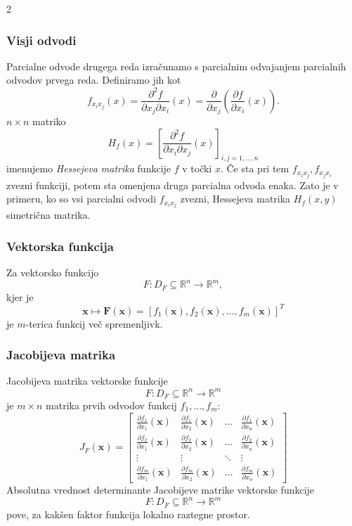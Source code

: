 \documentclass{article}
\begin{document}
\begin{multicols}{2}
	\subsubsection{Visji odvodi}
	Parcialne odvode drugega reda izračunamo s parcialnim odvajanjem parcialnih odvodov prvega reda. Definiramo jih kot
	\[
		f_{x_i x_j}(x) = \frac{\partial^2 f}{\partial x_j \partial x_i}(x) = \frac{\partial}{\partial x_j} \left( \frac{\partial f}{\partial x_i}(x) \right).
	\]
	\( n \times n \) matriko
	\[
		H_f(x) = \left[ \frac{\partial^2 f}{\partial x_i \partial x_j}(x) \right]_{i,j=1,...,n}
	\]
	imenujemo \textit{Hessejeva matrika} funkcije \( f \) v točki \( x \). Če sta pri tem \( f_{x_i x_j}, f_{x_j x_i} \) zvezni funkciji, potem sta omenjena druga parcialna odvoda enaka. Zato je v primeru, ko so vsi parcialni odvodi \( f_{x_i x_j} \) zvezni, Hessejeva matrika \( H_f(x, y) \) simetrična matrika.


	\subsubsection{Vektorska funkcija}
	Za vektorsko funkcijo
	\[ F: D_F \subseteq \mathbb{R}^n \rightarrow \mathbb{R}^m, \]
	kjer je
	\[ \mathbf{x} \mapsto \mathbf{F}(\mathbf{x}) = [f_1(\mathbf{x}), f_2(\mathbf{x}), \ldots, f_m(\mathbf{x})]^T \]
	je \( m \)-terica funkcij več spremenljivk.

	\subsubsection{Jacobijeva matrika}
	Jacobijeva matrika vektorske funkcije
	\[ F: D_F \subseteq \mathbb{R}^n \rightarrow \mathbb{R}^m \]
	je \( m \times n \) matrika prvih odvodov funkcij \( f_1, \ldots, f_m \):
	\[
		J_F(\mathbf{x}) = \begin{bmatrix}
			\frac{\partial f_1}{\partial x_1}(\mathbf{x}) & \frac{\partial f_1}{\partial x_2}(\mathbf{x}) & \ldots & \frac{\partial f_1}{\partial x_n}(\mathbf{x}) \\
			\frac{\partial f_2}{\partial x_1}(\mathbf{x}) & \frac{\partial f_2}{\partial x_2}(\mathbf{x}) & \ldots & \frac{\partial f_2}{\partial x_n}(\mathbf{x}) \\
			\vdots                                        & \vdots                                        & \ddots & \vdots                                        \\
			\frac{\partial f_m}{\partial x_1}(\mathbf{x}) & \frac{\partial f_m}{\partial x_2}(\mathbf{x}) & \ldots & \frac{\partial f_m}{\partial x_n}(\mathbf{x})
		\end{bmatrix}
	\]
	Absolutna vrednost determinante Jacobijeve matrike vektorske funkcije
	\[ F: D_F \subseteq \mathbb{R}^n \rightarrow \mathbb{R}^m \]
	pove, za kakšen faktor funkcija lokalno raztegne prostor.


\end{multicols}
\end{document}
